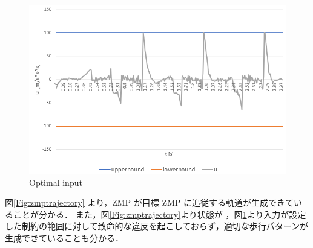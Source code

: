 \begin{figure}[hbtp]
  \centering
 \includegraphics[keepaspectratio, scale=0.6]
      {images/calculated_input.png}
\caption{Optimal input}
 \label{Fig:optimalinput}
\end{figure}

\newpage
図\ref{Fig:zmptrajectory} より，ZMP が目標 ZMP に追従する軌道が生成できていることが分かる． また，図\ref{Fig:zmptrajectory}より状態が ，図\ref{Fig:optimalinput}より入力が設定した制約の範囲に対して致命的な違反を起こしておらず，適切な歩行パターンが生成できていることも分かる．


